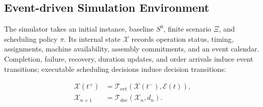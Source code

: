 















\subsection{Event-driven Simulation Environment}
\label{subsec:dynamic_environment}

The simulator takes an initial instance, baseline $S^0$, finite scenario $\Xi$, and scheduling policy $\pi$.
Its internal state $\mathcal X$ records operation status, timing, assignments, machine availability,
assembly commitments, and an event calendar. Completion, failure, recovery, duration updates,
and order arrivals induce event transitions; executable scheduling decisions induce decision transitions:

\begin{equation}
 \begin{aligned}
 \mathcal X(t^+)&=\mathcal T_{\mathrm{evt}}(\mathcal X(t^-),\mathcal E(t)),\\
 \mathcal X_{n+1}&=\mathcal T_{\mathrm{dec}}(\mathcal X_n,d_n).
 \end{aligned}
 \label{eq:event_decision_transition}
\end{equation}











